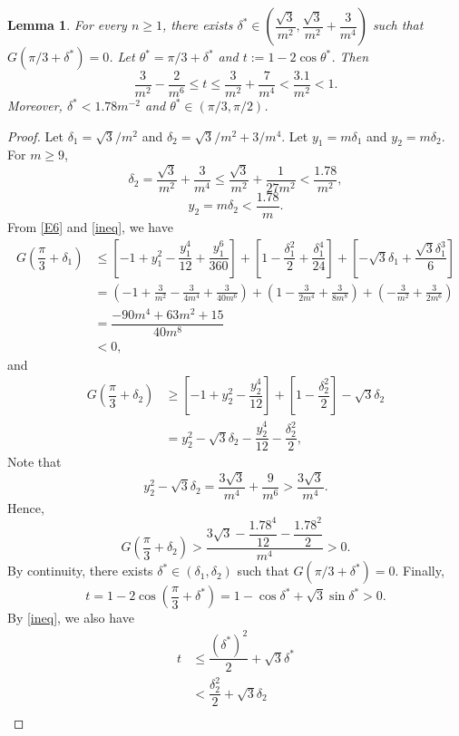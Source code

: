 \documentclass[10pt,a4paper]{amsart}
\newtheorem{lem}{Lemma}
\begin{document}
\begin{lem}\label{L1}
For every $n\geq 1$, there exists $\delta^{*}\in \left(\dfrac{\sqrt{3}}{m^2},\dfrac{\sqrt{3}}{m^2}+\dfrac{3}{m^4}\right)$
such that $G(\pi/3+\delta^*)=0$. Let $\theta^*=\pi/3+\delta^*$ and $t:=1-2\cos\theta^*$. Then \begin{equation}\label{E8}
\dfrac{3}{m^2}-\dfrac{2}{m^6}\leq t\leq \dfrac{3}{m^2}+\dfrac{7}{m^4}<\dfrac{3.1}{m^2}<1.
\end{equation}
Moreover, $\delta^*<1.78m^{-2}$ and $\theta^*\in (\pi/3,\pi/2)$.
\end{lem}

\begin{proof}
Let $\delta_1=\sqrt{3}/m^2$ and $\delta_2=\sqrt{3}/m^2+3/m^4$. Let $y_1=m\delta_1$ and $y_2=m\delta_2$. For $m\geq 9$, \[\delta_2=\dfrac{\sqrt{3}}{m^2}+\dfrac{3}{m^4}\leq \dfrac{\sqrt{3}}{m^2}+\dfrac{1}{27m^2}<\dfrac{1.78}{m^2},\]
\[y_2=m\delta_2<\dfrac{1.78}{m}.\]
From  \eqref{E6} and \eqref{ineq}, we have 
\[\begin{split}
G\left(\dfrac{\pi}{3}+\delta_1\right)&\leq \left[-1+y_1^2-\dfrac{y_1^4}{12}+\dfrac{y_1^6}{360}\right] +\left[1-\dfrac{\delta_1^2}{2}+\dfrac{\delta_1^4}{24}\right]+\left[-\sqrt{3}\delta_1+\dfrac{\sqrt{3}\delta_1^3}{6}\right]\\
&=\left(
-1+\frac{3}{m^2}-\frac{3}{4m^4}+\frac{3}{40m^6}
\right)+\left(
1-\frac{3}{2m^4}+\frac{3}{8m^8}
\right)+\left(
-\frac{3}{m^2}+\frac{3}{2m^6}
\right)\\
&=\dfrac{-90m^4+63m^2+15}{40m^8}\\
&<0,
\end{split}\]
and
\[\begin{split}
G\left(\dfrac{\pi}{3}+\delta_2\right)&\geq \left[-1+y_2^2-\dfrac{y_2^4}{12}\right]+\left[1-\dfrac{\delta_2^2}{2}\right]-\sqrt{3}\delta_2\\
&=y_2^2-\sqrt{3}\delta_2-\dfrac{y_2^4}{12}-\dfrac{\delta_2^2}{2},
\end{split}\]
Note that \[y_2^2-\sqrt{3}\delta_2=\dfrac{3\sqrt{3}}{m^4}+\dfrac{9}{m^6}>\dfrac{3\sqrt{3}}{m^4}.\]
Hence,
\[G\left(\dfrac{\pi}{3}+\delta_2\right)>\dfrac{3\sqrt{3}-\dfrac{1.78^4}{12}-\dfrac{1.78^2}{2}}{m^4}>0.\]
By continuity, there exists $\delta^*\in (\delta_1,\delta_2)$ such that $G(\pi/3+\delta^*)=0$.
Finally, \[t=1-2\cos(\dfrac{\pi}{3}+\delta^*)=1-\cos\delta^*+\sqrt{3}\sin\delta^*>0.\]
By \eqref{ineq}, we also have
\[\begin{split}t&\leq \dfrac{(\delta^*)^2}{2}+\sqrt{3}\delta^*\\
&<\dfrac{\delta_2^2}{2}+\sqrt{3}\delta_2\\

\end{split}\]
\end{proof}
\end{document}
